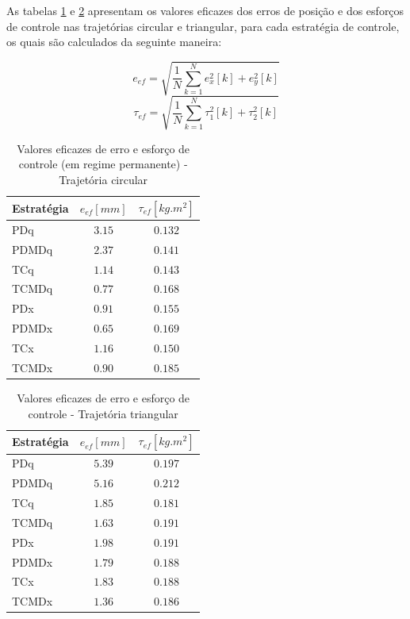 \documentclass[]{politex}
\begin{document}
As tabelas \ref{tab:valoresEficazesCirculo} e \ref{tab:valoresEficazesTriangulo} apresentam os valores eficazes dos erros de posição e dos esforços de controle nas trajetórias circular e triangular, para cada estratégia de controle, os quais são calculados da seguinte maneira:

\begin{equation}
e_{ef} = \sqrt{ \frac{1}{N}\sum_{k=1}^N e_x^2[k] + e_y^2[k] }
\end{equation}
\begin{equation}
\tau_{ef} = \sqrt{ \frac{1}{N}\sum_{k=1}^N \tau_1^2[k] + \tau_2^2[k] }
\end{equation}

\begin{table}[H] 
\centering
\caption{Valores eficazes de erro e esforço de controle (em regime permanente) - Trajetória circular}
\label{tab:valoresEficazesCirculo}
\begin{tabular}{l|c|c}
Estratégia & $e_{ef} [mm]$  & $\tau_{ef} [kg.m^2] $ \\ \hline
PDq        & $3.15$         & $0.132$               \\
PDMDq      & $2.37$         & $0.141$               \\
TCq        & $1.14$         & $0.143$               \\
TCMDq      & $0.77$         & $0.168$               \\
PDx        & $0.91$         & $0.155$               \\
PDMDx      & $0.65$         & $0.169$               \\
TCx        & $1.16$         & $0.150$               \\
TCMDx      & $0.90$         & $0.185$               \\
\end{tabular}
\end{table}

\begin{table}[H] 
\centering
\caption{Valores eficazes de erro e esforço de controle - Trajetória triangular}
\label{tab:valoresEficazesTriangulo}
\begin{tabular}{l|c|c}
Estratégia & $e_{ef} [mm]$  & $\tau_{ef} [kg.m^2] $ \\ \hline
PDq        & $5.39$         & $0.197$               \\
PDMDq      & $5.16$         & $0.212$               \\
TCq        & $1.85$         & $0.181$               \\
TCMDq      & $1.63$         & $0.191$               \\
PDx        & $1.98$         & $0.191$               \\
PDMDx      & $1.79$         & $0.188$               \\
TCx        & $1.83$         & $0.188$               \\
TCMDx      & $1.36$         & $0.186$               \\
\end{tabular}
\end{table}
\end{document}
